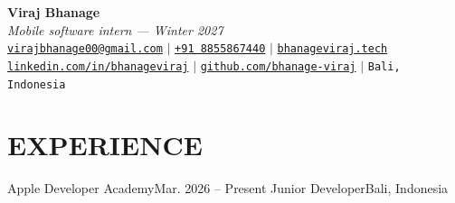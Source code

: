 


\begin{center}
    \textbf{\Huge Viraj Bhanage} \\ \vspace{4pt}
    {\small\textit{Mobile software intern --- Winter 2027}} \\ \vspace{4pt}
    \small
    \faEnvelope \hspace{2pt} \href{mailto:virajbhanage00@gmail.com}{\texttt{virajbhanage00@gmail.com}} \hspace{1pt} $|$
    \hspace{1pt} \faPhone \hspace{2pt} \href{tel:+918855867440}{\texttt{+91 8855867440}} \hspace{1pt} $|$
    \hspace{1pt} \href{https://www.bhanageviraj.tech}{\texttt{bhanageviraj.tech}} \\
    \faLinkedin \hspace{2pt} \href{https://www.linkedin.com/in/bhanageviraj/}{\texttt{linkedin.com/in/bhanageviraj}} \hspace{1pt} $|$
    \hspace{1pt} \faGithub \hspace{2pt} \href{https://github.com/bhanage-viraj}{\texttt{github.com/bhanage-viraj}} \hspace{1pt} $|$
    \hspace{1pt} \faMapMarker* \hspace{2pt}\texttt{Bali, Indonesia}
\end{center}

\section{EXPERIENCE}
  \resumeSubHeadingListStart
    \resumeSubheading
      {Apple Developer Academy}{Mar. 2026 -- Present}
      {Junior Developer}{Bali, Indonesia}
      \resumeItemListStart
      \resumeItemListEnd
  \resumeSubHeadingListEnd

